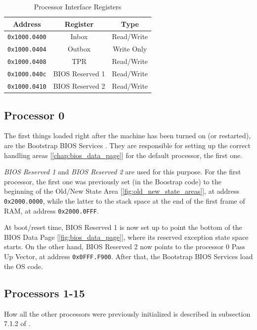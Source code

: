\documentclass[12pt,a4paper,openright,twoside]{report}
\begin{document}
\begin{table}[h]
	\centering
	\renewcommand{\arraystretch}{0.85}
	\begin{tabular}{|c|c|c|}
		\hline
		Address              & Register        & Type       \\ \hline\hline
		\texttt{0x1000.0400} & Inbox           & Read/Write \\ \hline
		\texttt{0x1000.0404} & Outbox          & Write Only \\ \hline
		\texttt{0x1000.0408} & TPR             & Read/Write \\ \hline
		\texttt{0x1000.040c} & BIOS Reserved 1 & Read/Write \\ \hline
		\texttt{0x1000.0410} & BIOS Reserved 2 & Read/Write \\ \hline
	\end{tabular}
	\caption{Processor Interface Registers}
	\label{tab:processor_interface_registers}
\end{table}

\subsection{Processor 0}
The first things loaded right after the machine has been turned on (or restarted), are the Bootstrap BIOS Services \cite{pops}.
They are responsible for setting up the correct handling areas [\autoref{chap:bios_data_page}] for the default processor, the first one.

\textit{BIOS Reserved 1} and \textit{BIOS Reserved 2} are used for this purpose.
For the first processor, the first one was previously set (in the Boostrap code) to the beginning of the Old/New State Area [\autoref{fig:old_new_state_areas}], at address \texttt{0x2000.0000}, while the latter to the stack space at the end of the first frame of RAM, at address \texttt{0x2000.0FFF}.

At boot/reset time, BIOS Reserved 1 is now set up to point the bottom of the BIOS Data Page [\autoref{fig:bios_data_page}], where its reserved exception state space starts.
On the other hand, BIOS Reserved 2 now points to the processor 0 Pass Up Vector, at address \texttt{0x0FFF.F900}.
After that, the Bootstrap BIOS Services load the OS code.

\subsection{Processors 1-15}
How all the other processors were previously initialized is described in subsection 7.1.2 of \cite{old_pops}.
\end{document}
